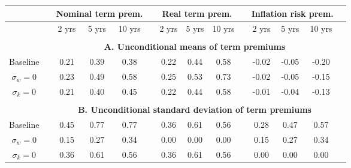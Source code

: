 \begin{tabular}{cccccccccccccc} \hline &&\multicolumn{3}{c}{Nominal term prem.}&&\multicolumn{3}{c}{Real term prem.}&&\multicolumn{3}{c}{Inflation risk prem.}\\ \hline &&2 yrs& 5 yrs& 10 yrs&&2 yrs& 5 yrs& 10 yrs&&2 yrs& 5 yrs& 10 yrs\\ \hline \\ && \multicolumn{11}{c}{\bf{A. Unconditional means of term premiums}}\\ \hline Baseline & & 0.21 & 0.39 & 0.38 &  & 0.22 & 0.44 & 0.58 &  & -0.02 & -0.05 & -0.20 \\ $\sigma_w=0$ & & 0.23 & 0.49 & 0.58 &  & 0.25 & 0.53 & 0.73 &  & -0.02 & -0.05 & -0.15 \\ $\sigma_k=0$ & & 0.21 & 0.40 & 0.45 &  & 0.22 & 0.44 & 0.58 &  & -0.01 & -0.04 & -0.13 \\  \hline \\ && \multicolumn{11}{c}{\bf{B. Unconditional standard deviation of term premiums}}\\ \hline Baseline & & 0.45 & 0.77 & 0.77 &  & 0.36 & 0.61 & 0.56 &  & 0.28 & 0.47 & 0.57 \\ $\sigma_w=0$ & & 0.15 & 0.27 & 0.34 &  & 0.00 & 0.00 & 0.00 &  & 0.15 & 0.27 & 0.34 \\ $\sigma_k=0$ & & 0.36 & 0.61 & 0.56 &  & 0.36 & 0.61 & 0.56 &  & 0.00 & 0.00 & 0.00 \\ \hline \end{tabular}